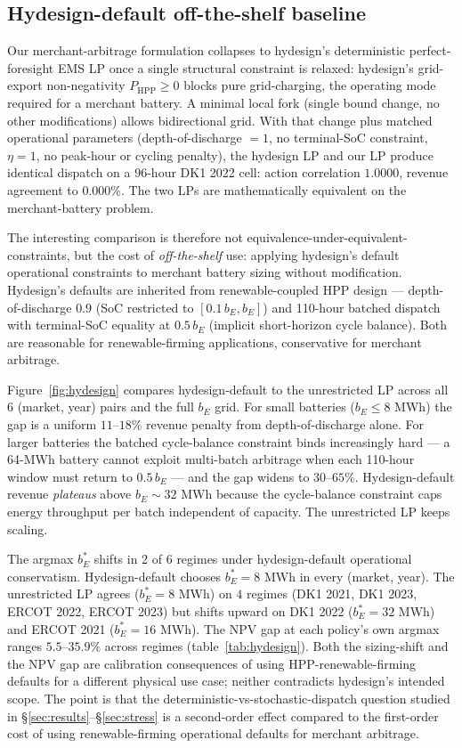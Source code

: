 \documentclass[11pt]{article}
\begin{document}
\subsection{Hydesign-default off-the-shelf baseline}\label{sec:hydesign}

Our merchant-arbitrage formulation collapses to hydesign's deterministic perfect-foresight EMS LP \citep{hydesign} once a single structural constraint is relaxed: hydesign's grid-export non-negativity $P_{\mathrm{HPP}} \ge 0$ blocks pure grid-charging, the operating mode required for a merchant battery. A minimal local fork (single bound change, no other modifications) allows bidirectional grid. With that change plus matched operational parameters (depth-of-discharge $= 1$, no terminal-SoC constraint, $\eta = 1$, no peak-hour or cycling penalty), the hydesign LP and our LP produce identical dispatch on a 96-hour DK1 2022 cell: action correlation $1.0000$, revenue agreement to $0.000\%$. The two LPs are mathematically equivalent on the merchant-battery problem.

The interesting comparison is therefore not equivalence-under-equivalent-constraints, but the cost of \emph{off-the-shelf} use: applying hydesign's default operational constraints to merchant battery sizing without modification. Hydesign's defaults are inherited from renewable-coupled HPP design --- depth-of-discharge $0.9$ (SoC restricted to $[0.1\,b_E, b_E]$) and 110-hour batched dispatch with terminal-SoC equality at $0.5\,b_E$ (implicit short-horizon cycle balance). Both are reasonable for renewable-firming applications, conservative for merchant arbitrage.

Figure~\ref{fig:hydesign} compares hydesign-default to the unrestricted LP across all 6 (market, year) pairs and the full $b_E$ grid. For small batteries ($b_E \le 8$ MWh) the gap is a uniform $11$--$18\%$ revenue penalty from depth-of-discharge alone. For larger batteries the batched cycle-balance constraint binds increasingly hard --- a 64-MWh battery cannot exploit multi-batch arbitrage when each 110-hour window must return to $0.5\,b_E$ --- and the gap widens to $30$--$65\%$. Hydesign-default revenue \emph{plateaus} above $b_E \sim 32$ MWh because the cycle-balance constraint caps energy throughput per batch independent of capacity. The unrestricted LP keeps scaling.

The argmax $b_E^*$ shifts in 2 of 6 regimes under hydesign-default operational conservatism. Hydesign-default chooses $b_E^* = 8$ MWh in every (market, year). The unrestricted LP agrees ($b_E^* = 8$ MWh) on $4$ regimes (DK1 2021, DK1 2023, ERCOT 2022, ERCOT 2023) but shifts upward on DK1 2022 ($b_E^* = 32$ MWh) and ERCOT 2021 ($b_E^* = 16$ MWh). The NPV gap at each policy's own argmax ranges $5.5$--$35.9\%$ across regimes (table~\ref{tab:hydesign}). Both the sizing-shift and the NPV gap are calibration consequences of using HPP-renewable-firming defaults for a different physical use case; neither contradicts hydesign's intended scope. The point is that the deterministic-vs-stochastic-dispatch question studied in \S\ref{sec:results}--\S\ref{sec:stress} is a second-order effect compared to the first-order cost of using renewable-firming operational defaults for merchant arbitrage.
\end{document}
